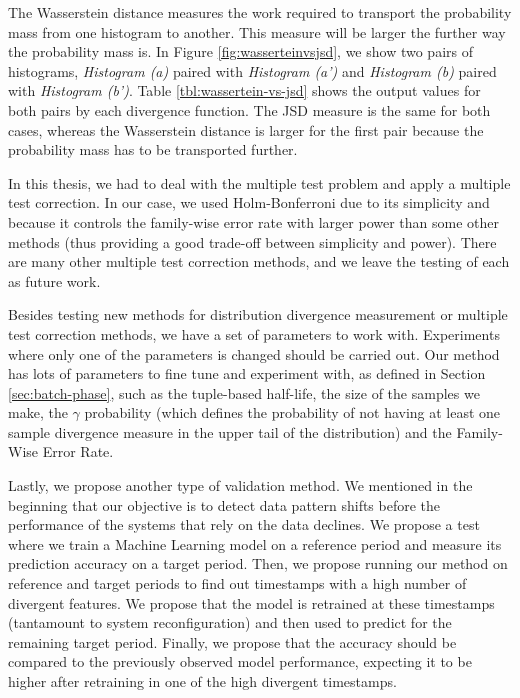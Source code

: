 The Wasserstein distance measures the work required to transport the probability mass from one histogram to another. This measure will be larger the further way the probability mass is. In Figure \ref{fig:wasserteinvsjsd}, we show two pairs of histograms, \textit{Histogram (a)} paired with \textit{Histogram (a')} and \textit{Histogram (b)} paired with \textit{Histogram (b')}. Table \ref{tbl:wassertein-vs-jsd} shows the output values for both pairs by each divergence function. The JSD measure is the same for both cases, whereas the Wasserstein distance is larger for the first pair because the probability mass has to be transported further.

In this thesis, we had to deal with the multiple test problem and apply a multiple test correction. In our case, we used Holm-Bonferroni due to its simplicity and because it controls the family-wise error rate with larger power than some other methods (thus providing a good trade-off between simplicity and power). There are many other multiple test correction methods, and we leave the testing of each as future work.

Besides testing new methods for distribution divergence measurement or multiple test correction methods, we have a set of parameters to work with. Experiments where only one of the parameters is changed should be carried out. Our method has lots of parameters to fine tune and experiment with, as defined in Section \ref{sec:batch-phase}, such as the tuple-based half-life, the size of the samples we make, the $\gamma$ probability (which defines the probability of not having at least one sample divergence measure in the upper tail of the distribution) and the Family-Wise Error Rate.

Lastly, we propose another type of validation method. We mentioned in the beginning that our objective is to detect data pattern shifts before the performance of the systems that rely on the data declines. We propose a test where we train a Machine Learning model on a reference period and measure its prediction accuracy on a target period. Then, we propose running our method on reference and target periods to find out timestamps with a high number of divergent features. We propose that the model is retrained at these timestamps (tantamount to system reconfiguration) and then used to predict for the remaining target period. Finally, we propose that the accuracy should be compared to the previously observed model performance, expecting it to be higher after retraining in one of the high divergent timestamps.
